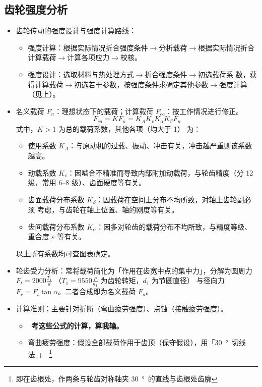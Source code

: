 \documentclass[12pt,a4paper]{article}
\newcommand{\tightlist}{\setlength{\parskip}{0pt}\setlength{\itemsep}{0pt}}
\newcommand{\hint}[1]{\textsf{（#1）}}
\newcommand{\minor}[1]{{\color{gray} #1}}
\newcommand{\then}{$\to$}
\renewcommand{\emph}[1]{\faIcon[regular]{lightbulb}\ \textbf{#1}}
\begin{document}
\subsection{齿轮强度分析}
\begin{itemize}\tightlist
    \item 齿轮传动的强度设计与强度计算路线：
    \begin{itemize}\tightlist
        \item 强度计算：根据实际情况折合强度条件\then 分析载荷\then 根据实际情况折合
        计算载荷\then 计算各项应力\then 校核。
        \item \minor{强度设计：选取材料与热处理方式\then 折合强度条件\then 初选载荷系
        数，获得计算载荷\then 初选若干参数，按强度条件求确定其他参数\then 强度计算
        \hint{见上}。}
    \end{itemize}
    \item 名义载荷 $F_n$：理想状态下的载荷；计算载荷 $F_{ca}$：按工作情况进行修正。
    \[F_{ca}=KF_n=K_AK_vK_\alpha K_\beta F_n\]
    式中，$K>1$ 为总的载荷系数，其他各项\hint{均大于 1} 为：
    \begin{itemize}\tightlist
        \item 使用系数 $K_A$：与原动机的过载、振动、冲击有关，冲击越严重则该系数越高。
        \item 动载系数 $K_v$：因啮合不精准而导致内部附加动载荷，与轮齿精度\hint{分 12
        级，常用 6--8 级}、齿面硬度等有关。
        \item 齿面载荷分布系数 $K_\beta$：因载荷在空间上分布不均所致，对轴上齿轮副必须
        考虑，与齿轮在轴上位置、轴的刚度等有关。
        \item 齿间载荷分布系数 $K_\alpha$：因多对轮齿的载荷分布不均所致，与精度等级、
        重合度 $\varepsilon$ 等有关。
    \end{itemize}
    以上所有系数均可查图表确定。
    \item 轮齿受力分析：常将载荷简化为「作用在齿宽中点的集中力」，分解为圆周力 $F_t=
    2000\frac{T_1}{d}$ \hint{$T_1=9550\frac{P}{n_1}$ 为齿轮转矩，$d_1$ 为节圆直径}
    与径向力 $F_r=F_t\tan\alpha$。二者合成即为名义载荷 $F_n$。
    \item 计算准则：主要针对折断\hint{弯曲疲劳强度}、点蚀\hint{接触疲劳强度}。
    \begin{itemize}\tightlist
        \item \emph{考这些公式的计算，算我输。}
        \item 弯曲疲劳强度：假设全部载荷作用于齿顶\hint{保守假设}，用「\SI{30}\degree
        切线法」
        \footnote{即在齿根处，作两条与轮齿对称轴夹 \SI{30}\degree 的直线与齿根处齿廓
}
\end{itemize}
\end{itemize}
\end{document}
